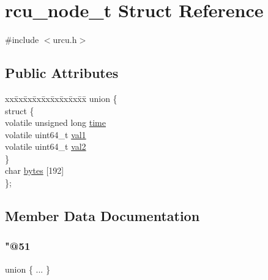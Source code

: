 \hypertarget{structrcu__node__t}{}\section{rcu\+\_\+node\+\_\+t Struct Reference}
\label{structrcu__node__t}


{\ttfamily \#include $<$urcu.\+h$>$}

\subsection*{Public Attributes}
\begin{DoxyCompactItemize}
\item 
\begin{tabbing}
xx\=xx\=xx\=xx\=xx\=xx\=xx\=xx\=xx\=\kill
union \{\\
\>struct \{\\
\>\>volatile unsigned long \hyperlink{structrcu__node__t_a760b5d954e54c86bc09dc1e2754c0307}{time}\\
\>\>volatile uint64\_t \hyperlink{structrcu__node__t_a39f0899a55b266866a7dddd8dac507b4}{val1}\\
\>\>volatile uint64\_t \hyperlink{structrcu__node__t_a37089d9851c8b558fea850ebec84eea8}{val2}\\
\>\} \\
\>char \hyperlink{structrcu__node__t_ae1e6b1ffa5df13f1a639d4f675c632e4}{bytes} \mbox{[}192\mbox{]}\\
\}; \\

\end{tabbing}\end{DoxyCompactItemize}


\subsection{Member Data Documentation}
\mbox{\label{structrcu__node__t_afaff9a2380ba1929d01ba0afed5d2011}} 
\subsubsection{\texorpdfstring{"@51}{@51}}
{\footnotesize\ttfamily union \{ ... \} }

\mbox{\label{structrcu__node__t_ae1e6b1ffa5df13f1a639d4f675c632e4}} 
